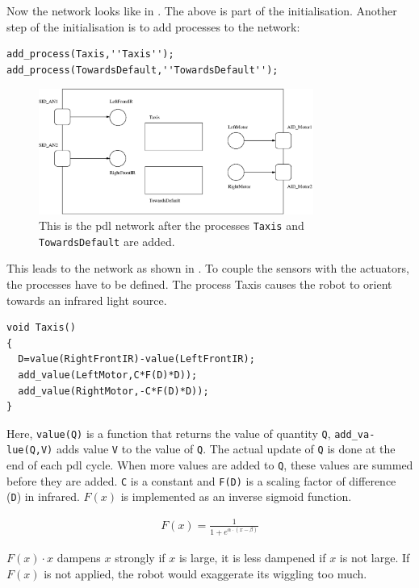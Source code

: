 Now the network looks like in . The above is part of the initialisation. Another step of the initialisation is to add processes to the network:

\begin{lstlisting}
add_process(Taxis,''Taxis'');
add_process(TowardsDefault,''TowardsDefault'');
\end{lstlisting}

\begin{figure}
\centerline{\includegraphics[width=9cm]{robots//pdl_networkc.eps}}
\caption{This is the {\sc pdl} network after the processes \texttt{Taxis} and \texttt{TowardsDefault} are added.}
\label{f:robots:pdl_networkc}
\end{figure}


This leads to the network as shown in . To couple the sensors with the actuators, the processes have to be defined. The process {\ttfamily Taxis} causes the robot to orient towards an infrared light source.


\begin{lstlisting}
void Taxis()
{
  D=value(RightFrontIR)-value(LeftFrontIR);
  add_value(LeftMotor,C*F(D)*D));
  add_value(RightMotor,-C*F(D)*D));
}
\end{lstlisting}


Here, \texttt{value(Q)} is a function that returns the value of quantity \texttt{Q}, {\tt add\_va-lue(Q,V)} adds value \texttt{V} to the value of \texttt{Q}. The actual update of \texttt{Q} is done at the end of each {\sc pdl} cycle. When more values are added to \texttt{Q}, these values are summed before they are added. \texttt{C} is a constant and \texttt{F(D)} is a scaling factor of difference (\texttt{D}) in infrared. $F(x)$ is implemented as an inverse sigmoid function.

\begin{eqnarray*}
F(x)=\frac{1}{1+e^{\alpha \cdot (x - \beta)}}
\end{eqnarray*}

$F(x)\cdot x$ dampens $x$ strongly if $x$ is large, it is less dampened if $x$ is not large. If $F(x)$ is not applied, the robot would exaggerate its wiggling too much.


